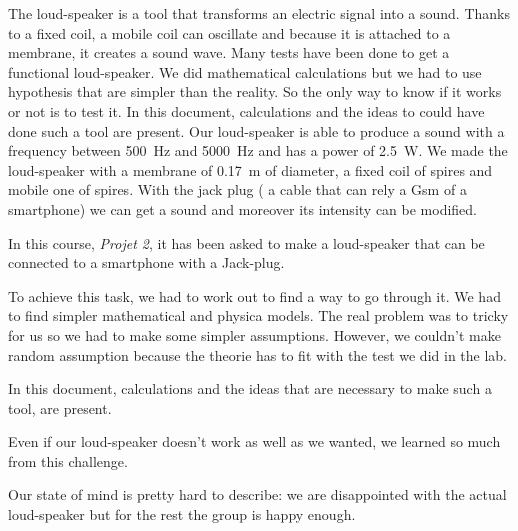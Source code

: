 

\begin{abstract-en}
The loud-speaker is a tool that transforms an electric signal into a sound.  Thanks to a fixed coil, a mobile coil can oscillate and because it is attached to a membrane, it creates a sound wave.  
Many tests have been done to get a functional loud-speaker.  We did mathematical calculations but we had to use hypothesis that are simpler than the reality.  So the only way to know if it works or not is to test it.
In this document, calculations and the ideas to could have done such a tool are present.  
Our loud-speaker is able to produce a sound with a frequency between \SI{500}{\hertz} and \SI{5000}{\hertz} and has a power of \SI{2.5}{\watt}.  We made the loud-speaker with a membrane of \SI{0.17}{\meter} of diameter, a fixed coil of  spires and mobile one of  spires.  With the jack plug ( a cable that can rely a Gsm of a smartphone) we can get a sound and moreover its intensity can be modified.


In this course, \textit{Projet 2}, it has been asked to make a loud-speaker that can be connected to a smartphone with a Jack-plug.

To achieve this task, we had to work out to find a way to go through it.  We had to find simpler mathematical and physica models.  
The real problem was to tricky for us so we had to make some simpler assumptions.  However, we couldn't make random assumption because the theorie has to fit with the test we did in the lab.

In this document, calculations and the ideas that are necessary to make such a tool, are present.

Even if our loud-speaker doesn't work as well as we wanted, we learned so much from this challenge.

Our state of mind is pretty hard to describe: we are disappointed with the actual loud-speaker but for the rest the group is happy enough.


\end{abstract-en}


